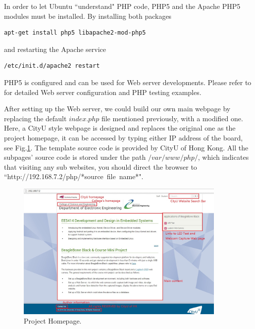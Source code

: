 \documentclass[12pt,journal,draftclsnofoot,onecolumn]{IEEEtran}
\begin{document}
In order to let Ubuntu  ``understand" PHP code, PHP5 and the Apache PHP5 modules must be installed. By installing both packages
\begin{lstlisting}[language={bash}]
apt-get install php5 libapache2-mod-php5
\end{lstlisting}
and restarting the Apache service
\begin{lstlisting}[language={bash}]
/etc/init.d/apache2 restart
\end{lstlisting}
PHP5 is configured and can be used for Web server developments. Please refer to \cite{Apache1} for detailed Web server configuration and PHP testing examples.

After setting up the Web server, we could build our own main webpage by replacing the default $index.php$ file mentioned previously, with a modified one. Here, a CityU style webpage is designed and replaces the original one as the project homepage, it can be accessed by typing either IP address of the board, see Fig.\ref{mainpage}. The template source code is provided by CityU of Hong Kong. All the subpages' source code is stored under the path $/var/www/php/$, which indicates that visiting any sub websites, you should direct the browser to ``http://192.168.7.2/php/*source\ file\ name*".
\begin{figure}[htb]
	\centering
	\includegraphics[width=4in]{./figs/mainpage.jpg}
	\caption{Project Homepage.}
	\label{mainpage}
\end{figure}
	
\end{document}
